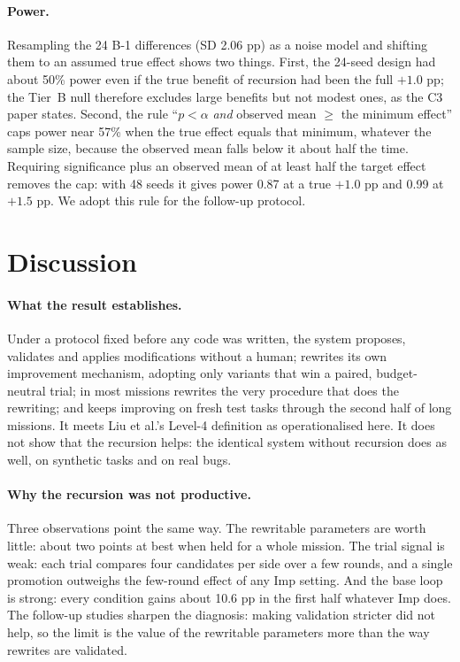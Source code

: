\documentclass[11pt]{article}
\begin{document}
\paragraph{Power.} Resampling the 24 B-1 differences (SD 2.06 pp) as a noise model and shifting them to an assumed true effect shows two things. First, the 24-seed design had about 50\% power even if the true benefit of recursion had been the full $+1.0$ pp; the Tier~B null therefore excludes large benefits but not modest ones, as the C3 paper states. Second, the rule ``$p < \alpha$ \emph{and} observed mean $\ge$ the minimum effect'' caps power near 57\% when the true effect equals that minimum, whatever the sample size, because the observed mean falls below it about half the time. Requiring significance plus an observed mean of at least half the target effect removes the cap: with 48 seeds it gives power 0.87 at a true $+1.0$ pp and 0.99 at $+1.5$ pp. We adopt this rule for the follow-up protocol.

\section{Discussion}\label{sec:discussion}

\paragraph{What the result establishes.} Under a protocol fixed before any code was written, the system proposes, validates and applies modifications without a human; rewrites its own improvement mechanism, adopting only variants that win a paired, budget-neutral trial; in most missions rewrites the very procedure that does the rewriting; and keeps improving on fresh test tasks through the second half of long missions. It meets Liu et al.'s Level-4 definition as operationalised here. It does not show that the recursion helps: the identical system without recursion does as well, on synthetic tasks and on real bugs.

\paragraph{Why the recursion was not productive.} Three observations point the same way. The rewritable parameters are worth little: about two points at best when held for a whole mission. The trial signal is weak: each trial compares four candidates per side over a few rounds, and a single promotion outweighs the few-round effect of any Imp setting. And the base loop is strong: every condition gains about 10.6 pp in the first half whatever Imp does. The follow-up studies sharpen the diagnosis: making validation stricter did not help, so the limit is the value of the rewritable parameters more than the way rewrites are validated.
\end{document}
